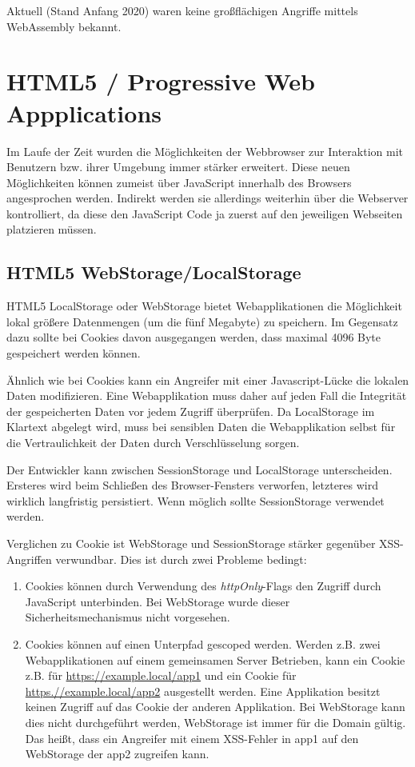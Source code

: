 Aktuell (Stand Anfang 2020) waren keine großflächigen Angriffe mittels WebAssembly bekannt.

\section{HTML5 / Progressive Web Appplications}

Im Laufe der Zeit wurden die Möglichkeiten der Webbrowser zur Interaktion mit Benutzern bzw. ihrer Umgebung immer stärker erweitert. Diese neuen Möglichkeiten können zumeist über JavaScript innerhalb des Browsers angesprochen werden. Indirekt werden sie allerdings weiterhin über die Webserver kontrolliert, da diese den JavaScript Code ja zuerst auf den jeweiligen Webseiten platzieren müssen.

\subsection{HTML5 WebStorage/LocalStorage}

HTML5 LocalStorage oder WebStorage bietet Webapplikationen die Möglichkeit lokal größere Datenmengen (um die fünf Megabyte) zu speichern. Im Gegensatz dazu sollte bei Cookies davon ausgegangen werden, dass maximal 4096 Byte gespeichert werden können.

Ähnlich wie bei Cookies kann ein Angreifer mit einer Javascript-Lücke die lokalen Daten modifizieren. Eine Webapplikation muss daher auf jeden Fall die Integrität der gespeicherten Daten vor jedem Zugriff überprüfen. Da LocalStorage im Klartext abgelegt wird, muss bei sensiblen Daten die Webapplikation selbst für die Vertraulichkeit der Daten durch Verschlüsselung sorgen.

Der Entwickler kann zwischen SessionStorage und LocalStorage unterscheiden. Ersteres wird beim Schließen des Browser-Fensters verworfen, letzteres wird wirklich langfristig persistiert. Wenn möglich sollte SessionStorage verwendet werden.

Verglichen zu Cookie ist WebStorage und SessionStorage stärker gegenüber XSS-Angriffen verwundbar. Dies ist durch zwei Probleme bedingt:

\begin{enumerate}
\item Cookies können durch Verwendung des \textit{httpOnly}-Flags den Zugriff durch JavaScript unterbinden. Bei WebStorage wurde dieser Sicherheitsmechanismus nicht vorgesehen.
\item Cookies können auf einen Unterpfad gescoped werden. Werden z.B. zwei Webapplikationen auf einem gemeinsamen Server Betrieben, kann ein Cookie z.B. für \url{https://example.local/app1} und ein Cookie für \url{https.//example.local/app2} ausgestellt werden. Eine Applikation besitzt keinen Zugriff auf das Cookie der anderen Applikation. Bei WebStorage kann dies nicht durchgeführt werden, WebStorage ist immer für die Domain gültig. Das heißt, dass ein Angreifer mit einem XSS-Fehler in app1 auf den WebStorage der app2 zugreifen kann.
\end{enumerate}


